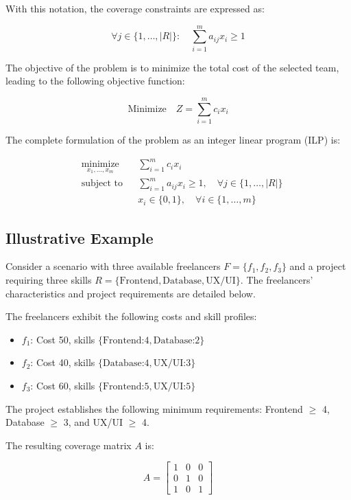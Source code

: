 \documentclass[12pt,a4paper]{article}
\begin{document}
With this notation, the coverage constraints are expressed as:

\[
\forall j \in \{1,\ldots,|R|\}: \quad \sum_{i=1}^{m} a_{ij} x_i \geq 1
\]

The objective of the problem is to minimize the total cost of the selected team, leading to the following objective function:

\[
\text{Minimize} \quad Z = \sum_{i=1}^{m} c_i x_i
\]

The complete formulation of the problem as an integer linear program (ILP) is:

\[
\begin{aligned}
	& \underset{x_1,\ldots,x_m}{\text{minimize}} & & \sum_{i=1}^{m} c_i x_i \\
	& \text{subject to} & & \sum_{i=1}^{m} a_{ij} x_i \geq 1, \quad \forall j \in \{1,\ldots,|R|\} \\
	& & & x_i \in \{0, 1\}, \quad \forall i \in \{1,\ldots,m\}
\end{aligned}
\]

\subsection{Illustrative Example}
\label{subsec:example}

Consider a scenario with three available freelancers $F = \{f_1, f_2, f_3\}$ and a project requiring three skills $R = \{\text{Frontend}, \text{Database}, \text{UX/UI}\}$. The freelancers' characteristics and project requirements are detailed below.

The freelancers exhibit the following costs and skill profiles:
\begin{itemize}
	\item $f_1$: Cost 50, skills $\{\text{Frontend:4}, \text{Database:2}\}$
	\item $f_2$: Cost 40, skills $\{\text{Database:4}, \text{UX/UI:3}\}$
	\item $f_3$: Cost 60, skills $\{\text{Frontend:5}, \text{UX/UI:5}\}$
\end{itemize}

The project establishes the following minimum requirements: Frontend $\geq$ 4, Database $\geq$ 3, and UX/UI $\geq$ 4.

The resulting coverage matrix $A$ is:

\[
A = \begin{bmatrix}
	1 & 0 & 0 \\  %
	0 & 1 & 0 \\  %
	1 & 0 & 1     %
\end{bmatrix}
\]
\end{document}
